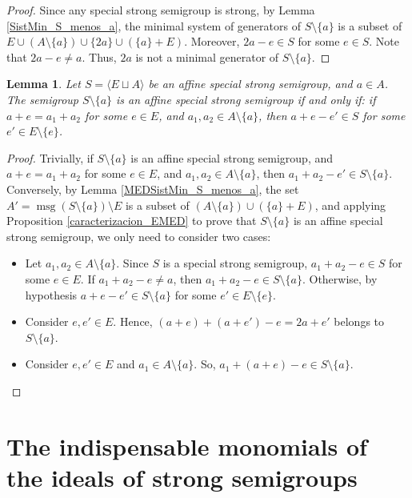 \documentclass[a4paper,11pt]{article}
\newtheorem{lemma}[theorem]{Lemma}
\def\msg{\operatorname{msg}}
\begin{document}
{\begin{proof}
Since any  special strong semigroup is strong, by Lemma \ref{SistMin_S_menos_a}, the minimal system of generators of $S\setminus\{a\}$ is a subset of $E\cup (A\setminus\{a\})\cup \{2a\} \cup (\{a\}+E)$. Moreover, $2a-e\in S$ for some $e\in S$. Note that $2a-e\neq a$. Thus, $2a$ is not a minimal generator of $S\setminus\{a\}$.
\end{proof}

\begin{lemma}\label{SmenosXMED}
Let $S=\langle E\sqcup A\rangle$ be an affine special strong semigroup, and $a\in A$. The semigroup $S\setminus \{a\}$ is an affine special strong semigroup if and only if: if $a+e= a_1+a_2$ for some $e\in E$, and $ a_1,a_2\in A\setminus \{a\}$, then $a+e-e'\in S$ for some $e'\in E\setminus\{e\}$.
\end{lemma}

\begin{proof}
Trivially, if $S\setminus\{a\}$ is an affine special strong semigroup, and $a+e= a_1+a_2$ for some $e\in E$, and $ a_1,a_2\in A\setminus \{a\}$, then $a_1+a_2-e'\in S\setminus\{a\}$.
Conversely, by Lemma \ref{MEDSistMin_S_menos_a}, the set $A'=\msg (S\setminus\{a\})\setminus E$ is a subset of $(A\setminus\{a\})\cup (\{a\}+E)$, and applying Proposition \ref{caracterizacion_EMED} to prove that $S\setminus\{a\}$ is an affine special strong semigroup, we only need to consider two cases:
\begin{itemize}
\item Let $a_1,a_2\in A\setminus\{a\}$. Since $S$ is a special strong semigroup, $a_1+a_2-e\in S$ for some $e\in E$. If $a_1+a_2-e\neq a$, then $a_1+a_2-e\in S\setminus\{a\}$. Otherwise, by hypothesis $a+e-e'\in S\setminus\{a\}$ for some $e'\in E\setminus\{e\}$.

\item Consider $e,e'\in E$. Hence, $(a+e)+(a+e')-e=2a+e'$ belongs to $S\setminus \{a\}$.

\item Consider $e,e'\in E$ and $a_1\in A\setminus\{a\}$. So, $a_1+(a+e)-e \in S\setminus \{a\}$.
\end{itemize}
\end{proof}

\section{The indispensable monomials of the ideals of strong semigroups}\label{sec:indisp}

}
\end{document}
